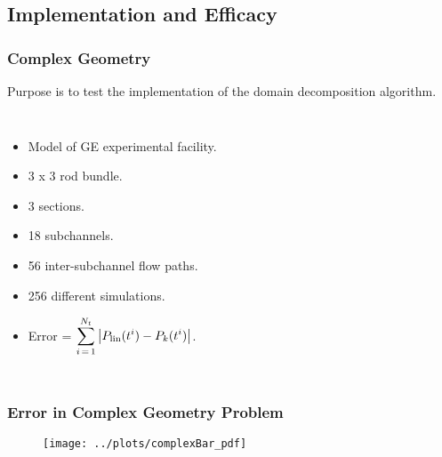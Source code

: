 \documentclass[compress,xcolor=table]{beamer}
\begin{document}
\subsection[Implementation \& Efficacy]{Implementation and Efficacy}
\begin{frame}
\frametitle{Complex Geometry}

Purpose is to test the implementation of the domain decomposition algorithm.

\begin{columns}

\begin{itemize}
\item{Model of GE experimental facility.}
\item{3 x 3 rod bundle.}
\item{3 sections.}
\item{18 subchannels.}
\item{56 inter-subchannel flow paths.}
\item{256 different simulations.}
\item{Error = $\displaystyle \sum_{i\,=\,1}^{N_{t}} \left|P_{\text{lin}}(t^{i}) -P_{k}(t^{i})\right|$.}
\end{itemize}


\begin{figure}[h!t]
\centering
\resizebox{\textwidth}{!}{

}
\end{figure}

\end{columns}
\end{frame}
\begin{frame}
\frametitle{Error in Complex Geometry Problem}

\begin{figure}[h!t]
\centering
\texttt{[image: ../plots/complexBar\_pdf]}
\end{figure}

\end{frame}
\end{document}
